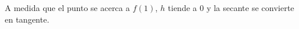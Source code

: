 \documentclass[preview]{standalone}
\begin{document}
\begin{center}
A medida que el punto se acerca a $f(1)$, $h$ tiende a 0 y la secante se convierte en tangente.
\end{center}
\end{document}
